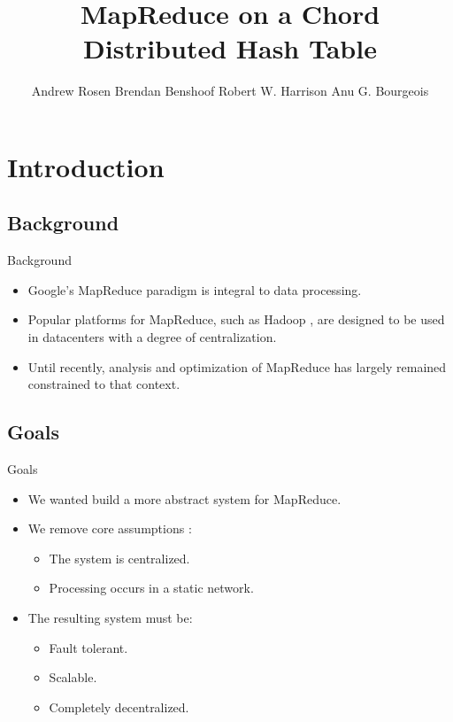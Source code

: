 \documentclass[11pt]{beamer}
\author[Andrew Rosen]{Andrew Rosen \qquad Brendan Benshoof \qquad Robert W. Harrison \qquad Anu G. Bourgeois}
\title{MapReduce on a Chord Distributed Hash Table}
\date{}
\begin{document}
\begin{frame}
\titlepage
\end{frame}

\begin{frame}
\tableofcontents
\end{frame}

\section{Introduction}

\subsection{Background}
\begin{frame}{Background}

\begin{itemize}
	\item Google's MapReduce \cite{mapreduce} paradigm is integral to data processing.
	\item Popular platforms for MapReduce, such as Hadoop \cite{hadoop}, are designed to be used in datacenters with a degree of centralization.  
	\item Until recently, analysis and optimization of MapReduce has largely remained constrained to that context.
\end{itemize}

\end{frame}

\subsection{Goals}
\begin{frame}{Goals}


\begin{itemize}
	\item We wanted build a more abstract system for MapReduce.
	\item We remove core assumptions \cite{hadoopAssumptions}:
	\begin{itemize}
		\item The system is centralized.
		\item Processing occurs in a static network.
	\end{itemize}
	\item The resulting system must be:
	\begin{itemize}
		\item Fault tolerant.
		\item Scalable.
		\item Completely decentralized.
	\end{itemize}
\end{itemize}

\end{frame}
\end{document}
